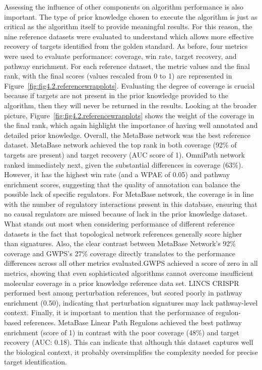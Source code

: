Assessing the influence of other components on algorithm performance is also important.
The type of prior knowledge chosen to execute the algorithm is just as critical as the algorithm itself to provide meaningful results.
For this reason, the nine reference datasets were evaluated to understand which allows more effective recovery of targets identified from the golden standard.
As before, four metrics were used to evaluate performance: coverage, win rate, target recovery, and pathway enrichment.
For each reference dataset, the metric values and the final rank, with the final scores (values rescaled from 0 to 1) are represented in Figure~\ref{fig:fig4.2.referencewrapplots}.
Evaluating the degree of coverage is crucial because if targets are not present in the prior knowledge provided to the algorithm, then they will never be returned in the results.
Looking at the broader picture, Figure~\ref{fig:fig4.2.referencewrapplots} shows the weight of the coverage in the final rank, which again highlight the importance of having well annotated and detailed prior knowledge.
Overall, the MetaBase network was the best reference dataset. MetaBase network achieved the top rank in both coverage (92\% of targets are present) and target recovery (\gls{AUC} score of 1).
OmniPath network ranked immediately next, given the substantial differences in coverage (63\%).
However, it has the highest win rate (and a \gls{WPAE} of 0.05) and pathway enrichment scores, suggesting that the quality of annotation can balance the possible lack of specific regulators.
For MetaBase network, the coverage is in line with the number of regulatory interactions present in this database, ensuring that no causal regulators are missed because of lack in the prior knowledge dataset.
What stands out most when considering performance of different reference datasets is the fact that topological network references generally score higher than signatures.
Also, the clear contrast between MetaBase Network's 92\% coverage and \gls{GWPS}'s 27\% coverage directly translates to the performance differences across all other metrics evaluated.\gls{GWPS} achieved a score of zero in all metrics, showing that even sophisticated algorithms cannot overcome insufficient molecular coverage in a prior knowledge reference data set. \gls{LINCS} \gls{CRISPR} performed best among perturbation references, but scored poorly in pathway enrichment (0.50), indicating that perturbation signatures may lack pathway-level context.
Finally, it is important to mention that the performance of regulon-based references.
MetaBase Linear Path Regulons achieved the best pathway enrichment (score of 1) in contrast with the poor coverage (48\%) and target recovery (\gls{AUC}: 0.18).
This can indicate that although this dataset captures well the biological context, it probably oversimplifies the complexity needed for precise target identification.

